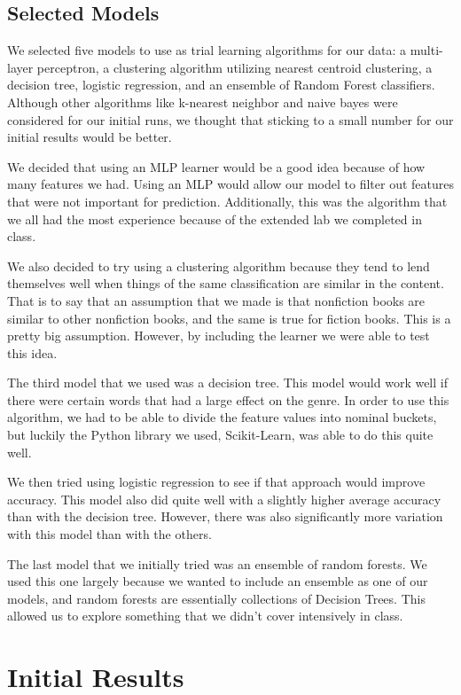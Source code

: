 \documentclass{article}
\begin{document}
\subsection{Selected Models}

We selected five models to use as trial learning algorithms for our data: a multi-layer perceptron, a clustering algorithm utilizing nearest centroid clustering, a decision tree, logistic regression, and an ensemble of Random Forest classifiers. Although other algorithms like k-nearest neighbor and naive bayes were considered for our initial runs, we thought that sticking to a small number for our initial results would be better.\par
We decided that using an MLP learner would be a good idea because of how many features we had. Using an MLP would allow our model to filter out features that were not important for prediction. Additionally, this was the algorithm that we all had the most experience because of the extended lab we completed in class. \par
We also decided to try using a clustering algorithm because they tend to lend themselves well when things of the same classification are similar in the content. That is to say that an assumption that we made is that nonfiction books are similar to other nonfiction books, and the same is true for fiction books. This is a pretty big assumption. However, by including the learner we were able to test this idea.\par
The third model that we used was a decision tree. This model would work well if there were certain words that had a large effect on the genre. In order to use this algorithm, we had to be able to divide the feature values into nominal buckets, but luckily the Python library we used, Scikit-Learn, was able to do this quite well. \par
We then tried using logistic regression to see if that approach would improve accuracy. This model also did quite well with a slightly higher average accuracy than with the decision tree. However, there was also significantly more variation with this model than with the others. \par
The last model that we initially tried was an ensemble of random forests. We used this one largely because we wanted to include an ensemble as one of our models, and random forests are essentially collections of Decision Trees. This allowed us to explore something that we didn’t cover intensively in class.

\section{Initial Results}
\end{document}
